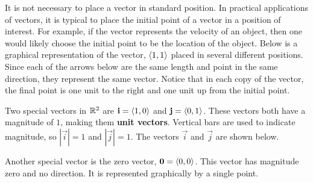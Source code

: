 \documentclass[handout]{ximera}
\begin{document}
It is not necessary to place a vector in standard position.  
In practical applications of vectors, it is typical to place the initial point of a vector in a position of interest.  
For example, if the vector represents the velocity of an object, then one would likely choose the initial point to be the location of the object.
Below is a graphical representation of the vector, $\left\langle 1,1\right\rangle$ placed in several different positions.
Since each of the arrows below are the same length and point in the same direction, they represent the same vector.
Notice that in each copy of the vector, the final point is one unit to the right and one unit up from the initial point. 
\begin{image}
\end{image}

Two special vectors in $\mathbb R^2$ are $\mathbf{i} = \left\langle 1,0\right\rangle$ and $\mathbf{j} = \left\langle 0,1\right\rangle$.
These vectors both have a magnitude of $1$, making them {\bf unit vectors}. 
Vertical bars are used to indicate magnitude, so $|\vec{i}| = 1$ and $|\vec{j}| = 1$.
The vectors $\vec{i}$ and $\vec{j}$ are shown below.

\begin{image}
\end{image}

Another special vector is the zero vector, $\mathbf{0} = \left\langle 0,0\right\rangle$.  
This vector has magnitude zero and no direction.  
It is represented graphically by a single point.
\end{document}
